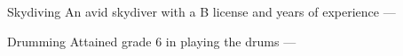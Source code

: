 

\begin{cvhonors}

  \cvhonor
    {Skydiving} %
    {An avid skydiver with a B license and years of experience} %
    {} %
    {---} %

  \cvhonor
    {Drumming} %
    {Attained grade 6 in playing the drums} %
    {} %
    {---} %

\end{cvhonors}

